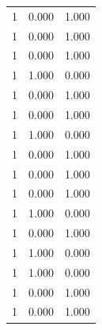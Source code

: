 \begin{tabular}{rrr}
1 & 0.000 & 1.000 \\
1 & 0.000 & 1.000 \\
1 & 0.000 & 1.000 \\
1 & 1.000 & 0.000 \\
1 & 0.000 & 1.000 \\
1 & 0.000 & 1.000 \\
1 & 1.000 & 0.000 \\
1 & 0.000 & 1.000 \\
1 & 0.000 & 1.000 \\
1 & 0.000 & 1.000 \\
1 & 1.000 & 0.000 \\
1 & 0.000 & 1.000 \\
1 & 1.000 & 0.000 \\
1 & 1.000 & 0.000 \\
1 & 0.000 & 1.000 \\
1 & 0.000 & 1.000 \\
\bottomrule
\end{tabular}
